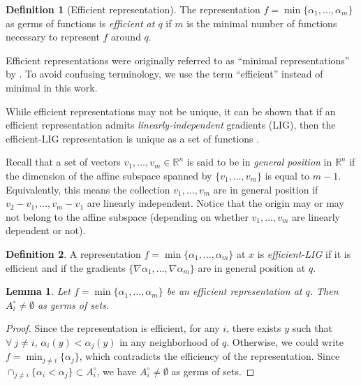 \documentclass[11pt]{article}
\newcommand{\R}{\mathbb{R}}
\newcommand{\inter}{\cap}
\newcommand{\grad}{\nabla}
\theoremstyle{plain}
\newtheorem{lem}{Lemma}
\theoremstyle{definition}
\newtheorem{defi}{Definition}
\theoremstyle{remark}
\begin{document}
	\begin{defi}[Efficient representation]
		The representation $f = \min \{ \alpha_1, \ldots, \alpha_m\}$ as germs of functions is \emph{efficient at $q$} if $m$ is the minimal number of functions necessary to represent $f$ around $q$. \label{def:efficient_repr}
	\end{defi}
	
	Efficient representations were originally referred to as ``minimal representations'' by \cite{gershkovich_morse_1997}. To avoid confusing terminology, we use the term ``efficient'' instead of minimal in this work. 
	
	While efficient representations may not be unique, it can be shown that if an efficient representation admits \emph{linearly-independent} gradients (LIG), then the efficient-LIG representation is unique as a set of functions \citep{gershkovich_morse_1997}. 
	
	Recall that a set of vectors $v_1,\ldots,v_m \in \R^n$ is said to be in \emph{general position} in $\R^n$ if the dimension of the affine subspace spanned by $\{v_1,\ldots,v_m\}$ is equal to $m-1$.  Equivalently, this means the collection $v_1,\ldots, v_m$ are in general position if $v_2 - v_1, \ldots, v_m - v_1$ are linearly independent.  Notice that the origin may or may not belong to the affine subspace (depending on whether $v_1,\ldots,v_m$ are linearly dependent or not).
	
	\begin{defi}
		\label{def:LIG}
		A representation $f = \min \{\alpha_1,\ldots,\alpha_m\}$ at $x$ is \emph{efficient-LIG} if it is efficient and if the gradients $\{\grad \alpha_1,\ldots,\grad \alpha_m\}$ are in general position at $q$.
	\end{defi}
	
	
	\begin{lem}
		\label{lem:efficient_non_empty}
		Let $f = \min \{\alpha_1,\ldots,\alpha_m\}$ be an efficient representation at $q$. Then $A_i^\circ \neq \emptyset$ as germs of sets.
	\end{lem}
	\begin{proof}
		Since the representation is efficient, for any $i$, there exists $y$ such that $\forall\ j \neq i,\, \alpha_i(y) < \alpha_j(y)$ in any neighborhood of $q$. Otherwise, we could write $f = \min_{j \neq i} \{ \alpha_j\}$, which contradicts the efficiency of the representation. Since $\inter_{j \neq i} \{\alpha_i < \alpha_j\} \subset A_i^\circ$, we have $A_i^\circ \neq \emptyset$ as germs of sets.
	\end{proof}
	
\end{document}
